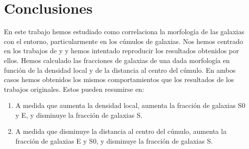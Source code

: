 \documentclass[a4paper,10pt]{article}
\def\aj {AJ}
\def\mnras {MNRAS}
\begin{document}
\section{Conclusiones}

En este trabajo hemos estudiado como correlaciona la morfolog\'ia de las galaxias con el entorno, particularmente en los c\'umulos de galaxias. Nos hemos centrado en los trabajos de \citet{Dressler1980} y \citet{Whitmore1993} y hemos intentado reproducir los resultados obtenidos por ellos. Hemos calculado las fracciones de galaxias de una dada morfolog\'ia en funci\'on de la densidad local y de la distancia al centro del c\'umulo. En ambos casos hemos obtenidos los mismos comportamientos que los resultados de los trabajos originales. Estos pueden resumirse en:
\begin{enumerate}
 \item A medida que aumenta la densidad local, aumenta la fracci\'on de galaxias S0 y E, y disminuye la fracci\'on de galaxias S.
 \item A medida que disminuye la distancia al centro del c\'umulo, aumenta la fracci\'on de galaxias E y S0, y disminuye la  fracci\'on de galaxias S.
\end{enumerate}




















\end{document}
